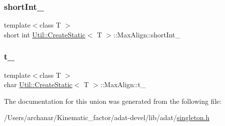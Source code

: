 \mbox{\label{unionUtil_1_1CreateStatic_1_1MaxAlign_a334412ad4ce26924cece7d29af8e8631}} 
\subsubsection{\texorpdfstring{shortInt\_}{shortInt\_}}
{\footnotesize\ttfamily template$<$class T $>$ \\
short int \mbox{\hyperlink{structUtil_1_1CreateStatic}{Util\+::\+Create\+Static}}$<$ T $>$\+::Max\+Align\+::short\+Int\+\_\+}

\mbox{\label{unionUtil_1_1CreateStatic_1_1MaxAlign_afd4240e90cbb2875a201cea03af46086}} 
\subsubsection{\texorpdfstring{t\_}{t\_}}
{\footnotesize\ttfamily template$<$class T $>$ \\
char \mbox{\hyperlink{structUtil_1_1CreateStatic}{Util\+::\+Create\+Static}}$<$ T $>$\+::Max\+Align\+::t\+\_\+}



The documentation for this union was generated from the following file\+:\begin{DoxyCompactItemize}
\item 
/\+Users/archanar/\+Kinematic\+\_\+factor/adat-\/devel/lib/adat/\mbox{\hyperlink{adat-devel_2lib_2adat_2singleton_8h}{singleton.\+h}}\end{DoxyCompactItemize}
